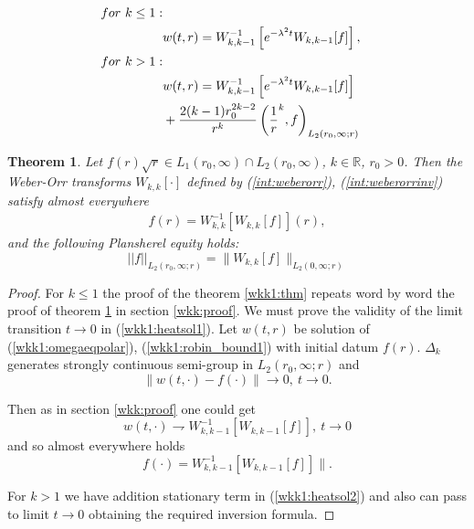 \documentclass[10pt,a4paper]{amsart}
\newtheorem{thm}{Theorem}
\newcommand{\RM}{\mathbb{R}}
\begin{document}
\begin{align}
{\rm for~} k \leq 1:\nonumber  \\
&w(t,r) = W^{-1}_{k,k-1}\left [ e^{-\lambda^2 t} W_{k,k-1}[f] \right ], \label{wkk1:heatsol1}\\
{\rm for~} k > 1: \nonumber \\
&w(t,r) = W^{-1}_{k,k-1}\left [ e^{-\lambda^2 t} W_{k,k-1}[f] \right ]\label{wkk1:heatsol2}\\
&+ \frac {2(k-1) r_0^{2k-2}} {r^{k}} \left (\frac 1 r^{k}, f \right )_{L_2(r_0,\infty; r)} \nonumber
\end{align}

\begin{thm}\label{wkk:thm}Let $f(r) \sqrt r \in L_1(r_0,\infty)\cap L_2(r_0,\infty)$, $k \in \RM$, $r_0>0$. Then the  Weber-Orr transforms $W_{k,k}[\cdot]$ defined by (\ref{int:weberorr}), (\ref{int:weberorrinv}) satisfy  almost everywhere 
\begin{align}\label{wkk:inversion_formula}
f(r) = W^{-1}_{k,k}\left [W_{k,k} [f] \right ](r), 
\end{align}
and the following Plansherel equity holds:
$$
||f||_{L_2(r_0,\infty; r)} = \| W_{k,k}[f] \|_{L_2(0,\infty; r) } 
$$
\end{thm}

\begin{proof}

For $k\leq 1$ the proof of the theorem \ref{wkk1:thm} repeats word by word the proof of theorem \ref{wkk:thm} in section \ref{wkk:proof}. We must prove the validity of the limit transition $t\to 0$ in (\ref{wkk1:heatsol1}). Let $w(t,r)$ be solution of (\ref{wkk1:omegaeqpolar}), (\ref{wkk1:robin_bound1}) with initial datum $f(r)$. $\Delta_k$ generates strongly continuous semi-group in $L_2(r_0,\infty; r)$ and 
$$
\|w(t,\cdot) - f(\cdot)\| \to 0,~t\to 0.
$$ 

Then as in section \ref{wkk:proof} one could get
$$
w(t,\cdot) \rightharpoondown W^{-1}_{k,k-1}\left [W_{k,k-1} [f] \right ],~t\to 0
$$
and so almost everywhere holds
$$f(\cdot)=W^{-1}_{k,k-1}\left [W_{k,k-1} [f] \right ]\|.$$

For $k>1$ we have addition stationary term in (\ref{wkk1:heatsol2}) and also can pass to limit $t\to 0$ obtaining the required inversion formula.
\end{proof}
\end{document}
